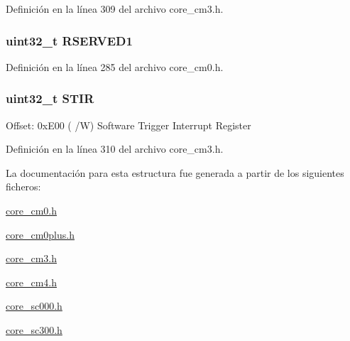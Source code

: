 Definición en la línea 309 del archivo core\+\_\+cm3.\+h.

\subsubsection[{\texorpdfstring{R\+S\+E\+R\+V\+E\+D1}{RSERVED1}}]{\setlength{\rightskip}{0pt plus 5cm}uint32\+\_\+t R\+S\+E\+R\+V\+E\+D1}\hypertarget{struct_n_v_i_c___type_a62ae13b33cd85ec43b6f84d85b7ea9c6}{}\label{struct_n_v_i_c___type_a62ae13b33cd85ec43b6f84d85b7ea9c6}


Definición en la línea 285 del archivo core\+\_\+cm0.\+h.

\subsubsection[{\texorpdfstring{S\+T\+IR}{STIR}}]{ uint32\+\_\+t S\+T\+IR}\hypertarget{struct_n_v_i_c___type_a471c399bb79454dcdfb342a31a5684ae}{}\label{struct_n_v_i_c___type_a471c399bb79454dcdfb342a31a5684ae}
Offset\+: 0x\+E00 ( /W) Software Trigger Interrupt Register 

Definición en la línea 310 del archivo core\+\_\+cm3.\+h.



La documentación para esta estructura fue generada a partir de los siguientes ficheros\+:\begin{DoxyCompactItemize}
\item 
\hyperlink{core__cm0_8h}{core\+\_\+cm0.\+h}\item 
\hyperlink{core__cm0plus_8h}{core\+\_\+cm0plus.\+h}\item 
\hyperlink{core__cm3_8h}{core\+\_\+cm3.\+h}\item 
\hyperlink{core__cm4_8h}{core\+\_\+cm4.\+h}\item 
\hyperlink{core__sc000_8h}{core\+\_\+sc000.\+h}\item 
\hyperlink{core__sc300_8h}{core\+\_\+sc300.\+h}\end{DoxyCompactItemize}
